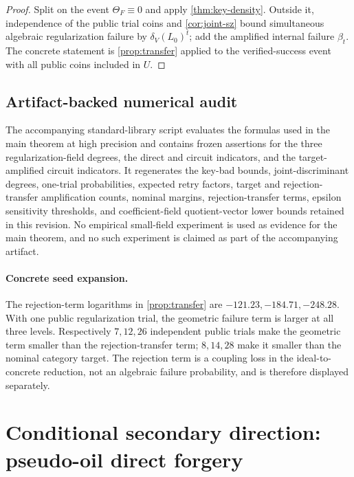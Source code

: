 \documentclass[10pt,a4paper]{article}
\begin{document}
\begin{proof}
Split on the event $\Theta_F\equiv0$ and apply \cref{thm:key-density}.  Outside it, independence of the public trial coins and \cref{cor:joint-sz} bound simultaneous algebraic regularization failure by $\delta_V(L_0)^t$; add the amplified internal failure $\beta_t$.  The concrete statement is \cref{prop:transfer} applied to the verified-success event with all public coins included in $U$.
\end{proof}

\subsection{Artifact-backed numerical audit}

The accompanying standard-library script  evaluates the formulas used in the main theorem at high precision and contains frozen assertions for the three regularization-field degrees, the direct and circuit indicators, and the target-amplified circuit indicators.  It regenerates the key-bad bounds, joint-discriminant degrees, one-trial probabilities, expected retry factors, target and rejection-transfer amplification counts, nominal margins, rejection-transfer terms, epsilon sensitivity thresholds, and coefficient-field quotient-vector lower bounds retained in this revision.  No empirical small-field experiment is used as evidence for the main theorem, and no such experiment is claimed as part of the accompanying artifact.

\paragraph{Concrete seed expansion.}
The rejection-term logarithms in \cref{prop:transfer} are $-121.23,-184.71,-248.28$.  With one public regularization trial, the geometric failure term is larger at all three levels.  Respectively $7,12,26$ independent public trials make the geometric term smaller than the rejection-transfer term; $8,14,28$ make it smaller than the nominal category target.  The rejection term is a coupling loss in the ideal-to-concrete reduction, not an algebraic failure probability, and is therefore displayed separately.

\section{Conditional secondary direction: pseudo-oil direct forgery}\label{sec:pseudo-oil}
\end{document}
